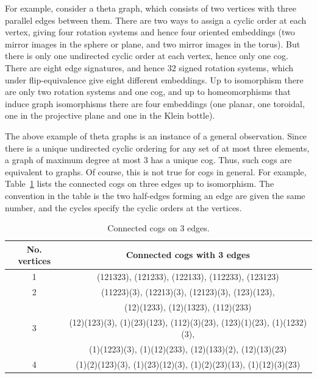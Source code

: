 \documentclass{amsart}
\theoremstyle{definition}
\theoremstyle{remark}
\numberwithin{equation}{section}
\begin{document}
For example, consider a theta graph, which consists of two vertices with three parallel edges between them.
There are two ways to assign a cyclic order at each vertex, giving four rotation systems and hence four oriented embeddings (two mirror images in the sphere or plane, and two mirror images in the torus).
But there is only one undirected cyclic order at each vertex, hence only one cog.  There are eight edge signatures, and hence $32$ signed rotation systems, which under flip-equivalence give eight different embeddings.  Up to isomorphism there are only two rotation systems and one cog, and up to homeomorphisms that induce graph isomorphisms there are four embeddings (one planar, one toroidal, one in the projective plane and one in the Klein bottle).

The above example of theta graphs is an instance of a general observation. Since there is a unique undirected cyclic ordering for any set of at most three elements, a graph of maximum degree at most $3$ has a unique cog. Thus, such cogs are equivalent to graphs. Of course, this is not true for cogs in general. For example, Table~\ref{tab:cogs} lists the connected cogs on three edges up to isomorphism. The convention in the table is the two half-edges forming an edge are given the same number, and the cycles specify the cyclic orders at the vertices. 

\begin{table}
\centering
\begin{tabular}{|c|c|}\hline
No. vertices & Connected cogs with 3 edges  \\ \hline
1 & (121323), (121233), (122133), (112233), (123123) \\ \hline
2 & (11223)(3), (12213)(3), (12123)(3), (123)(123), \\ 
 & (12)(1233), (12)(1323), (112)(233) \\ \hline
3 & (12)(123)(3), (1)(23)(123), (112)(3)(23), (123)(1)(23), (1)(1232)(3), \\ 
 & (1)(1223)(3), (1)(12)(233), (12)(133)(2), (12)(13)(23) \\ \hline
4 & (1)(2)(123)(3), (1)(23)(12)(3), (1)(2)(23)(13), (1)(12)(3)(23)
\\ \hline
\end{tabular}

\caption{Connected cogs on 3 edges.}
\label{tab:cogs}
\end{table}




\medskip
\end{document}
